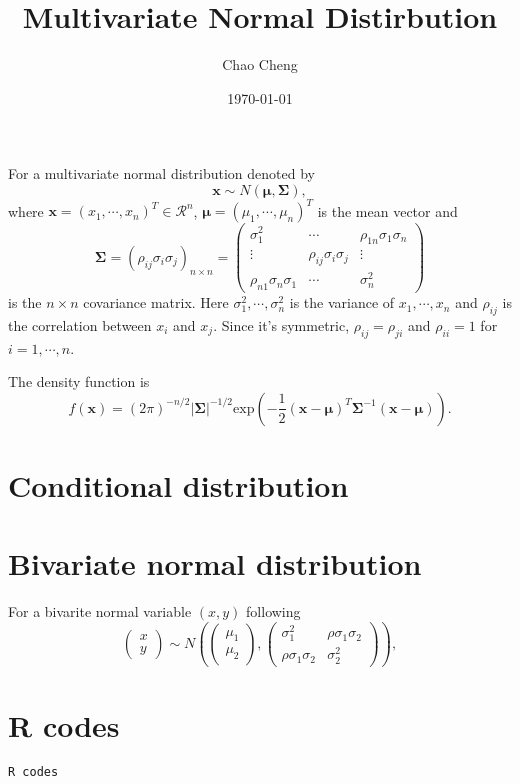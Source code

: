 \documentclass[a4paper,12pt]{article}
\title{Multivariate Normal Distirbution}
\author{Chao Cheng}
\date{\today}
\begin{document}
\maketitle

For a multivariate normal distribution denoted by
\[
  \bm{x} \sim
  N\left(
    \bm{\mu}, \bm{\Sigma}
  \right)
  ,
\]
where $\bm{x} = \left(x_1, \cdots, x_n\right)^T\in\mathcal{R}^n$, $\bm{\mu} = \left(\mu_1, \cdots, \mu_n\right)^T$ is the mean vector and
\[
  \bm{\Sigma} = \left(
    \rho_{ij}\sigma_i\sigma_j
  \right)_{n\times n}
  =
  \begin{pmatrix}
    \sigma_1^2 & \cdots & \rho_{1n}\sigma_1\sigma_n    \\
    \vdots & \rho_{ij}\sigma_i\sigma_j & \vdots    \\
    \rho_{n1}\sigma_n\sigma_1 & \cdots & \sigma_n^2
  \end{pmatrix}
\]
is the $n\times n$ covariance matrix. Here $\sigma_1^2, \cdots, \sigma_n^2$ is the variance of $x_1, \cdots, x_n$ and $\rho_{ij}$ is the correlation between $x_i$ and $x_j$. Since it's symmetric, $\rho_{ij} = \rho_{ji}$ and $\rho_{ii} = 1$ for $i = 1, \cdots, n$.
\par
The density function is
\[
  f\left(\bm{x}\right) =
  \left(2\pi\right)^{-n / 2}
  \left|\bm{\Sigma}\right|^{-1 / 2}
  \mathrm{exp}\left(
    -\frac{1}{2}
    \left(\bm{x} - \bm{\mu}\right)^T
    \bm{\Sigma}^{-1}
    \left(\bm{x} - \bm{\mu}\right)
  \right)
  .
\]

\section{Conditional distribution}
\label{sec:cond-distr}



\section{Bivariate normal distribution}
\label{sec:bivar-norm-distr}

For a bivarite normal variable $\left(x, y\right)$ following
\[
  \begin{pmatrix}
    x    \\
    y
  \end{pmatrix}
  \sim N\left(
    \begin{pmatrix}
      \mu_1    \\
      \mu_2
    \end{pmatrix},
    \begin{pmatrix}
      \sigma_1^2 & \rho\sigma_1\sigma_2    \\
      \rho\sigma_1\sigma_2 & \sigma_2^2
    \end{pmatrix}
  \right)
  ,
\]







\clearpage
\appendix

\section{R codes}
\begin{verbatim}
R codes
\end{verbatim}
\end{document}

